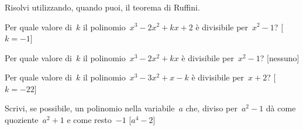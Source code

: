 % 

\subsubsection*{}

\begin{esercizio}[\Ast]
\label{ese:div.006}
Risolvi utilizzando, quando puoi, il teorema di Ruffini.
 \begin{enumeratea}
 \item Per quale valore di~$k$ il polinomio~$x^{3}-2x^{2}+kx+2$ 
  è divisibile per~$x^{2}-1$? \hfill[$k=-1$]
 \item Per quale valore di~$k$ il polinomio~$x^{3}-2x^{2}+kx$ 
  è divisibile per~$x^{2}-1$? \hfill[nessuno]
 \item Per quale valore di~$k$ il polinomio~$x^{3}-3x^{2}+x-k$ 
  è divisibile per~$x+2$? \hfill[$k=-22$]
 \item Scrivi, se possibile, un polinomio nella variabile~$a$ che, 
  diviso per~$a^{2}-1$ dà come quoziente~$a^{2}+1$ e come resto~$-1$ 
  \hfill[$a^{4}-2$]
 \end{enumeratea}
\end{esercizio}


